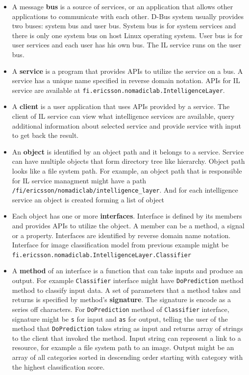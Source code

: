 \documentclass[english, 12pt, a4paper, elec, utf8, online]{aaltothesis}
\begin{document}
\begin{itemize}
\item
A message \textbf{bus} is a source of services, or an application that allows other applications to communicate with each other. D-Bus system usually provides two buses: system bus and user bus. System bus is for system services and there is only one system bus on host Linux operating system. User bus is for user services and each user has his own bus. The IL service runs on the user bus.  
\item
A \textbf{service} is a program that provides APIs to utilize the service on a bus. A service has a unique name specified in reverse domain notation. APIs for IL service are available at \texttt{fi.ericsson.nomadiclab.IntelligenceLayer}.   
\item
A \textbf{client} is a user application that uses APIs provided by a service. The client of IL service can view what intelligence services are available, query additional information about selected service and provide service with input to get back the result.  
\item
An \textbf{object} is identified by an object path and it belongs to a service. Service can have multiple objects that form directory tree like hierarchy. Object path looks like a file system path. For example, an object path that is responsible for IL service managment might have a path \texttt{/fi/ericsson/nomadiclab/intelligence\_layer}. And for each intelligence service an object is created forming a list of object

\item
Each object has one or more \textbf{interfaces}. Interface is defined by its members and provides APIs to utilize the object. A member can be a method, a signal or a property. Interfaces are identified by reverse domain name notation. Interface for image classification  model from previous example might be \texttt{fi.ericsson.nomadiclab.IntelligenceLayer.Classifier}     
\item
A \textbf{method} of an interface is a function that can take inputs and produce an output. For example \texttt{Classifier} interface might have \texttt{DoPrediction} method method to classify input data. A set of parameters that a method takes and returns is specified by method's \textbf{signature}. The signature is encode as a series off characters. For \texttt{DoPrediction} method of \texttt{Classifier} interface, signature might be \texttt{s} for input and \texttt{as} for output, telling the user of the method that \texttt{DoPrediction} takes string as input and returns array of strings to the client that invoked the method. Input string can represent a link to a resource, for example a file system path to an image. Output might be an array of all categories sorted in descending order starting with category with the highest classification score.             

\end{itemize}
\end{document}
